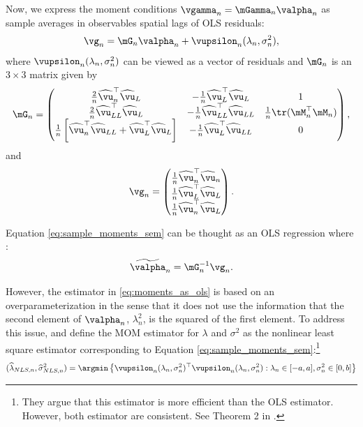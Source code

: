 \documentclass[english,12pt]{book}\usepackage[]{graphicx}\usepackage[]{xcolor}
\begin{document}
Now, we express the moment conditions $\vgamma_n = \mGamma_n\valpha_n$ as sample averages in observables spatial lags of OLS residuals:
\begin{equation}\label{eq:sample_moments_sem}
  \vg_n = \mG_n\valpha_n +  \vupsilon_n(\lambda_n, \sigma^2_n),
\end{equation}
%
where $\vupsilon_n(\lambda_n, \sigma^2_n)$ can be viewed as a vector of residuals and $\mG_n$ is an $3\times 3$ matrix given by
\begin{equation}\label{eq:matrix-G-sem}
  \mG_n = \begin{pmatrix}
   \frac{2}{n}\widehat{\vu}^\top_n\widehat{\vu}_L & -\frac{1}{n}\widehat{\vu}_L^\top\widehat{\vu}_L & 1\\
   \frac{2}{n}\widehat{\vu}^\top_{LL}\widehat{\vu}_L & -\frac{1}{n}\widehat{\vu}_{LL}^\top\widehat{\vu}_{LL} & \frac{1}{n} \tr(\mM^\top_n\mM_n)\\
   \frac{1}{n}\left[\widehat{\vu}^\top_n\widehat{\vu}_{LL} + \widehat{\vu}_L^\top\widehat{\vu}_L\right] & -\frac{1}{n}\widehat{\vu}_{L}^\top\widehat{\vu}_{LL} & 0
        \end{pmatrix},
\end{equation}
%
and
\begin{equation}\label{eq:matrix-g-sem}
  \vg_n = \begin{pmatrix}
  \frac{1}{n}\widehat{\vu}^\top_n\widehat{\vu}_n \\
  \frac{1}{n}\widehat{\vu}^\top_L\widehat{\vu}_L \\
  \frac{1}{n}\widehat{\vu}^\top_n\widehat{\vu}_L
        \end{pmatrix}.
\end{equation}

Equation \eqref{eq:sample_moments_sem} can be thought as an OLS regression where \citep{kelejian1998generalized}:
\begin{equation}\label{eq:moments_as_ols}
\widetilde{\valpha}_n = \mG_n^{-1}\vg_n.
\end{equation}

However, the estimator in \eqref{eq:moments_as_ols} is based on an overparameterization in the sense that it does not use the information that the second element of $\valpha_n$, $\lambda^2_n$, is the squared of the first element. To address this issue, \cite{kelejian1998generalized} and \cite{kelejian1999generalized} define the MOM estimator for $\lambda$ and $\sigma^2$ as the nonlinear least square estimator corresponding to Equation \eqref{eq:sample_moments_sem}:\footnote{They argue that this estimator is more efficient than the OLS estimator. However, both estimator are consistent. See Theorem 2 in \citep{kelejian1998generalized}.}
\begin{equation}\label{eq:nls_estimator}
  (\widehat{\lambda}_{NLS, n}, \widehat{\sigma}^2_{NLS, n}) = \argmin \left\lbrace \vupsilon_n(\lambda_n, \sigma^2_n)^\top\vupsilon_n(\lambda_n, \sigma^2_n): \lambda_n \in [-a, a], \sigma^2_n\in [0, b]\right\rbrace 
\end{equation}
\end{document}
